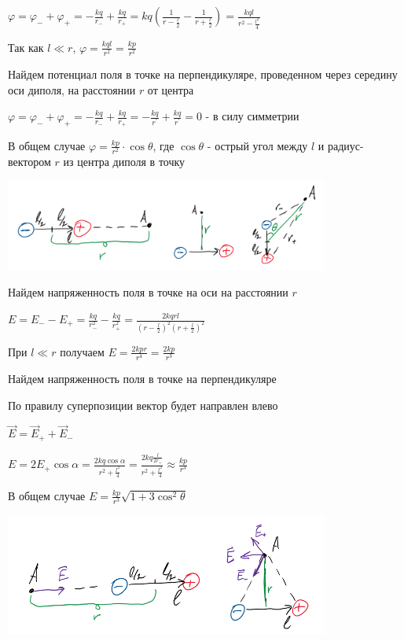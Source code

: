 \documentclass[12pt]{article}
\begin{document}
$\varphi = \varphi_- + \varphi_+ = -\frac{kq}{r_-} + \frac{kq}{r_+} = kq \left(\frac{1}{r - \frac{l}{2}} - \frac{1}{r + \frac{l}{2}}\right) = 
\frac{kql}{r^2 - \frac{l^2}{4}}$

Так как $l \ll r$, $\varphi = \frac{kql}{r^2} = \frac{kp}{r^2}$

 Найдем потенциал поля в точке на перпендикуляре, проведенном через середину оси диполя, на расстоянии $r$ от центра

$\varphi = \varphi_- + \varphi_+ = -\frac{kq}{r_-} + \frac{kq}{r_+} = -\frac{kq}{r^\prime} + \frac{kq}{r^\prime} = 0$ - в силу симметрии

 В общем случае $\varphi = \frac{kp}{r^2} \cdot \cos\theta$, 
где $\cos\theta$ - острый угол между $l$ и радиус-вектором $r$ из центра диполя в точку

\begin{center}
    \includegraphics[width=0.8\textwidth]{physics1/images/physics1_2024_12_02_2}
\end{center}

 Найдем напряженность поля в точке на оси на расстоянии $r$

$E = E_- - E_+ = \frac{kq}{r_-^2} - \frac{kq}{r_+^2} = \frac{2kqrl}{(r - \frac{l}{2})^2 (r + \frac{l}{2})^2}$

При $l \ll r$ получаем $E = \frac{2kpr}{r^4} = \frac{2kp}{r^3}$


 Найдем напряженность поля в точке на перпендикуляре

По правилу суперпозиции вектор будет направлен влево

$\vec{E} = \vec{E}_+ + \vec{E}_-$

$E = 2E_+ \cos\alpha = \frac{2kq\cos\alpha}{r^2 + \frac{l^2}{4}} = \frac{2kq\frac{l}{2r_+}}{r^2 + \frac{l^2}{4}} \approx \frac{kp}{r^3}$

 В общем случае $E = \frac{kp}{r^3} \sqrt{1 + 3\cos^2 \theta}$

\begin{center}
    \includegraphics[width=0.8\textwidth]{physics1/images/physics1_2024_12_02_1}
\end{center}
\end{document}
